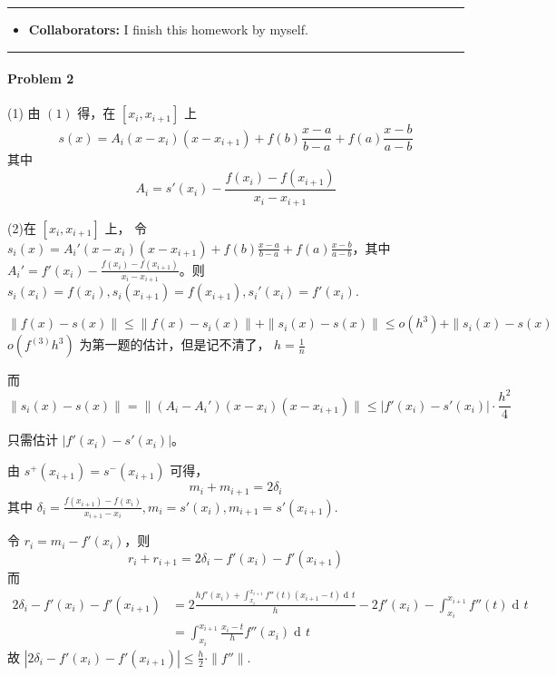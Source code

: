 \documentclass[a4paper]{article}
\theoremstyle{definition}
\theoremstyle{plain}
\newcommand{\<}{\left<}
\renewcommand{\>}{\right>}
\numberwithin{equation}{problem}
\DeclareMathOperator{\dd}{d\!}
\begin{document}
\courseheader
{}
\rule{\textwidth}{1pt}
\begin{itemize}
\item {\bf Collaborators: \/}
  I finish this homework by myself. 
\end{itemize}
\rule{\textwidth}{1pt}

\vspace{2em}

\sloppy
{}
\paragraph{Problem 2} 
(1) 由 $ (1) $ 得，在 $ [x_i,x_{i+1}] $ 上
\[s(x)=A_i(x-x_i)(x-x_{i+1})+f(b)\frac{x-a}{b-a}+f(a)\frac{x-b}{a-b}\]
其中
\[A_i=s'(x_i)-\frac{f(x_i)-f(x_{i+1})}{x_i-x_{i+1}}\]

(2)在 $ [x_i,x_{i+1}] $ 上，  令  $ s_i(x)=A_i'(x-x_i)(x-x_{i+1})+f(b)\frac{x-a}{b-a}+f(a)\frac{x-b}{a-b} $，其中 $ A_i'=f'(x_i)-\frac{f(x_i)-f(x_{i+1})}{x_i-x_{i+1}} $。则 $ s_i(x_i)=f(x_i),s_i(x_{i+1})=f(x_{i+1}),s_{i}'(x_i)=f'(x_i) $.

\[\|f(x)-s(x)\| \leq \|f(x)-s_i(x)\|+\|s_i(x)-s(x)\| \leq o(h^3)+\|s_i(x)-s(x)\]
 $ o(f^{(3)}h^3) $ 为第一题的估计，但是记不清了， $ h=\frac{1}{n} $ 
 
而
\[\|s_i(x)-s(x)\|=\|(A_i-A_i')(x-x_i)(x-x_{i+1})\| \leq |f'(x_i)-s'(x_i)|\cdot\frac{h^2}{4}\]

只需估计 $ |f'(x_i)-s'(x_i)| $。

由 $ s^+(x_{i+1})=s^-(x_{i+1}) $ 可得，
\[m_i+m_{i+1}=2\delta_i\]
其中 $ \delta_i=\frac{f(x_{i+1})-f(x_i)}{x_{i+1}-x_i}, m_i=s'(x_i),m_{i+1}=s'(x_{i+1}) $.  

令  $ r_i=m_i-f'(x_i) $，则
\[r_i+r_{i+1}=2\delta_i-f'(x_i)-f'(x_{i+1})\]
而
\[\begin{aligned}
  2\delta_i-f'(x_i)-f'(x_{i+1})&=2\frac{hf'(x_i)+\int_{x_i}^{x_{i+1}}f''(t)(x_{i+1}-t)\dd t}{h}-2f'(x_i)-\int_{x_i}^{x_{i+1}}f''(t)\dd t\\
  &=\int_{x_i}^{x_{i+1}}\frac{x_i-t}{h}f''(x_i)\dd t
\end{aligned}\] 
故 $ |2\delta_i-f'(x_i)-f'(x_{i+1})| \leq \frac{h}{2}\cdot\|f''\| $.
\end{document}

